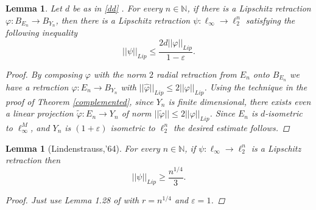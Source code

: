 \documentclass[11pt]{amsart}
\newcommand{\ep}{\varepsilon}
\newcommand{\N}{\mathbb{N}}
\newcommand{\<}{\langle}
\renewcommand{\>}{\rangle}
\newtheorem{lemma}[theorem]{Lemma}
\theoremstyle{definition}
\theoremstyle{remark}
\numberwithin{equation}{section}
\begin{document}
\begin{lemma}\label{lemmaballstospace}
Let $d$ be as in \eqref{dd} . For every $n\in\N$, if there is a Lipschitz retraction $\varphi:B_{E_n}\rightarrow B_{Y_n}$, then there is a Lipschitz retraction $\psi:\ell_{\infty}\rightarrow \ell_2^n$  satisfying the following inequality
$$||\psi||_{Lip}\le\frac{2d||\varphi||_{Lip}}{1-\ep}.$$
\begin{proof}
By composing $\varphi$ with the norm $2$ radial retraction from $E_n$ onto $B_{E_n}$ we have a retraction $\widehat{\varphi}: E_n\to B_{Y_n}$ with
$||\widehat{\varphi}||_{Lip}\le2||\varphi||_{Lip}$.
Using the technique in the proof of Theorem \ref{complemented}, since $Y_n$ is finite dimensional, there exists even a linear projection
 $\widetilde{\varphi}:E_n\to Y_n$ of norm $||\widetilde{\varphi}||\le2||\varphi||_{Lip}$.
Since $E_n$ is $d$-isometric to $\ell_\infty^M$, and $Y_n$ is $(1+\ep)$ isometric to $\ell_2^n$ the desired estimate follows.
\end{proof}
\end{lemma}

\begin{lemma}[Lindenstrauss,'64]\label{lemmaLind}
For every $n\in\N$, if $\psi:\ell_{\infty}\rightarrow\ell^{n}_2$ is a Lipschitz retraction then
$$||\psi||_{Lip}\ge \frac{n^{1/4}}{3}.$$
\begin{proof}
Just use Lemma 1.28 of \cite{BL2000} with $r=n^{1/4}$ and $\ep=1$.
\end{proof}
\end{lemma}
\end{document}

